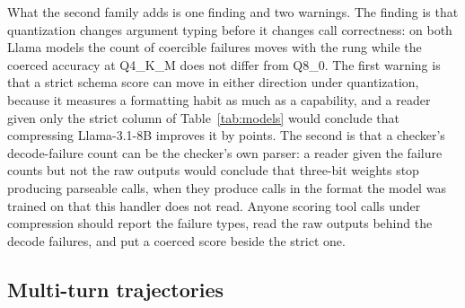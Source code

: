 \documentclass[12pt,letterpaper]{article}
\begin{document}
What the second family adds is one finding and two warnings. The finding is that quantization changes argument typing before it changes call correctness: on both Llama models the count of coercible failures moves with the rung while the coerced accuracy at Q4\_K\_M does not differ from Q8\_0. The first warning is that a strict schema score can move in either direction under quantization, because it measures a formatting habit as much as a capability, and a reader given only the strict column of Table~\ref{tab:models} would conclude that compressing Llama-3.1-8B improves it by \qtDropLlamaEightBThree{} points. The second is that a checker's decode-failure count can be the checker's own parser: a reader given the failure counts but not the raw outputs would conclude that three-bit weights stop producing parseable calls, when they produce calls in the format the model was trained on that this handler does not read. Anyone scoring tool calls under compression should report the failure types, read the raw outputs behind the decode failures, and put a coerced score beside the strict one.

\begin{table}[t]
\centering\scriptsize\setlength{\tabcolsep}{2.5pt}

\caption{The second family. Failure types on \texttt{simple\_python} ($n=\qtNEightB{}$ per rung, one run): strict failures, of which type errors and decode failures, the decode failures whose raw output is one well-formed JSON call, and the strict failures that pass the coerced checker. GSM8K strict accuracy, $n=400$, with Wilson 95\% intervals, each model against its own Q8\_0 by McNemar's exact test, with the Holm-adjusted $p$ in brackets.}
\label{tab:llama}
\end{table}

\subsection{Multi-turn trajectories}
\label{sec:multiturn}
\end{document}
